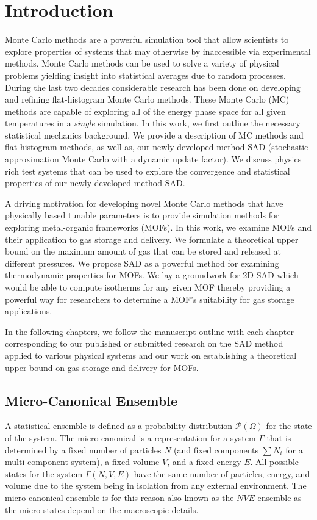 \chapter{Introduction}

Monte Carlo methods are a powerful simulation tool that allow scientists to explore properties of systems that may otherwise by inaccessible via experimental methods. Monte Carlo methods can be used to solve a variety of physical problems yielding insight into statistical averages due to random processes. During the last two decades considerable research has been done on developing and refining flat-histogram Monte Carlo methods.  These Monte Carlo (MC) methods are capable of exploring all of the energy phase space for all given temperatures in a \emph{single} simulation. In this work, we first outline the necessary statistical mechanics background. We provide a description of MC methods and flat-histogram methods, as well as, our newly developed method SAD (stochastic approximation Monte Carlo with a dynamic update factor). We discuss physics rich test systems that can be used to explore the convergence and statistical properties of our newly developed method SAD. 

A driving motivation for developing novel Monte Carlo methods that have physically based tunable parameters is to provide simulation methods for exploring metal-organic frameworks (MOFs). In this work, we examine MOFs and
their application to gas storage and delivery. We formulate a theoretical upper
bound on the maximum amount of gas that can be stored and released at different
pressures. We propose SAD as a powerful method for examining thermodynamic properties for MOFs.  We lay a groundwork for 2D SAD which would be able to compute isotherms for any given MOF thereby providing a powerful way for researchers to determine a MOF's suitability for gas storage applications.

In the following chapters, we follow the manuscript outline with each chapter corresponding to our published or submitted research on the SAD method applied to various physical systems and our work on establishing a theoretical upper bound on gas storage and delivery for MOFs.

\section{Micro-Canonical Ensemble}\label{micro}
A statistical ensemble is defined as a probability distribution $\mathcal{P}\left(\Omega\right)$ for the state of the system.
The micro-canonical is a representation for a system $\Gamma$ that is determined by a fixed number of particles $N$ (and fixed components $\sum N_i$ for a multi-component system), a fixed volume $V$, and a fixed energy $E$. All possible states for the system $\Gamma\left(N,V,E\right)$ have the same number of particles, energy, and volume due to the system being in isolation from any external environment.
The micro-canonical ensemble is for this reason also known as the $NVE$ ensemble as the micro-states depend on the  macroscopic details.

